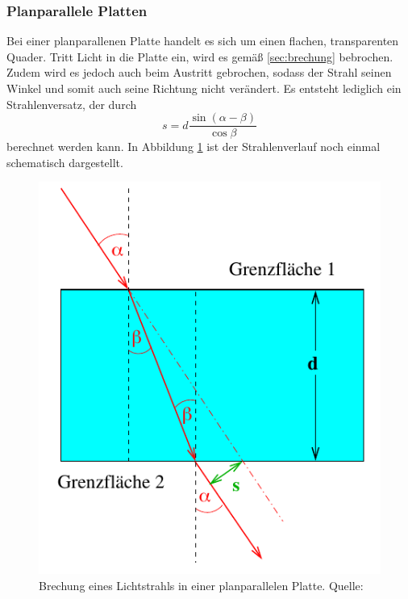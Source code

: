 \subsubsection*{Planparallele Platten}
\label{sec:platten}
Bei einer planparallenen Platte handelt es sich um einen flachen, transparenten Quader. Tritt Licht in die Platte ein, wird
es gemäß \ref{sec:brechung} bebrochen. Zudem wird es jedoch auch beim Austritt gebrochen, sodass der Strahl seinen Winkel und
somit auch seine Richtung nicht verändert. Es entsteht lediglich ein Strahlenversatz, der durch 
\begin{equation}
    s=d\frac{\sin(\alpha-\beta)}{\cos\beta}
    \label{eqn:strahlenversatz}
\end{equation} 
berechnet werden kann. In Abbildung \ref{fig:platten} ist der Strahlenverlauf noch einmal schematisch dargestellt.
\begin{figure}[H]
    \centering
    \includegraphics[scale = 0.5]{pictures/Platte.png}
    \caption{Brechung eines Lichtstrahls in einer planparallelen Platte. Quelle: \cite{AP01}}
    \label{fig:platten}
\end{figure}

